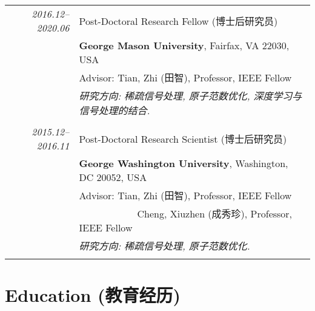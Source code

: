 \documentclass[paper=a4,fontsize=11pt]{scrartcl}
\begin{document}
\begin{longtable}{r|p{12cm}}
\emph{2016.12--2020.06} & Post-Doctoral Research Fellow (博士后研究员)\\
& \normalsize\textbf{George Mason University}, Fairfax, VA 22030, USA\\
& Advisor: Tian, Zhi (田智), Professor, IEEE Fellow \\
& \emph{研究方向: 稀疏信号处理, 原子范数优化, 深度学习与信号处理的结合.} \\
	\multicolumn{2}{c}{} \\


  \emph{2015.12--2016.11} & Post-Doctoral Research Scientist (博士后研究员)\\
  & \normalsize\textbf{George Washington University}, Washington, DC 20052, USA\\
  & Advisor: Tian, Zhi (田智), Professor, IEEE Fellow \\
  & ~~~~~~~~~~~~Cheng, Xiuzhen (成秀珍), Professor, IEEE Fellow \\
  & \emph{研究方向: 稀疏信号处理, 原子范数优化.}\\
  \multicolumn{2}{c}{} 

%
	

\end{longtable}

\section*{Education (教育经历)}
\end{document}
